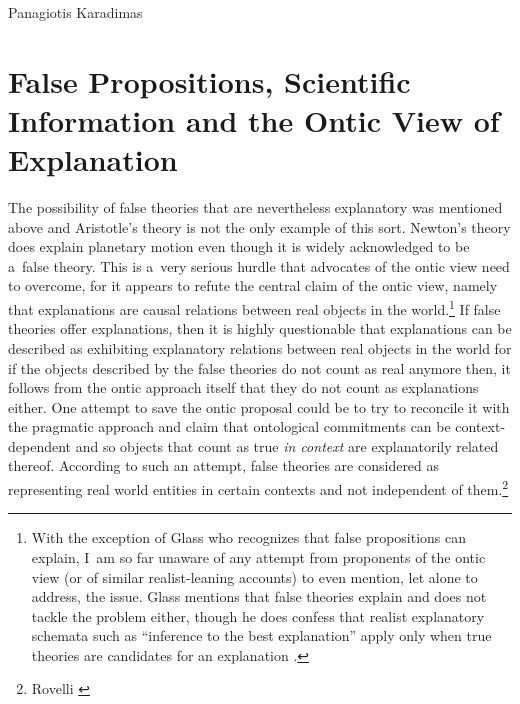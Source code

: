 \begin{artengenv}{Panagiotis Karadimas}
\section{False Propositions, Scientific Information and the Ontic View of Explanation}
The possibility of false theories that are nevertheless explanatory was mentioned above and Aristotle's theory is not the only example of this sort. Newton's theory does explain planetary motion even though it is widely acknowledged to be a~false theory. This is a~very serious hurdle that advocates of the ontic view need to overcome, for it appears to refute the central claim of the ontic view, namely that explanations are causal relations between real objects in the world.\footnote{With the exception of Glass who recognizes that false propositions can explain, I~am so far unaware of any attempt from proponents of the ontic view (or of similar realist-leaning accounts) to even mention, let alone to address, the issue. Glass mentions that false theories explain and does not tackle the problem either, though he does confess that realist explanatory schemata such as ``inference to the best explanation'' apply only when true theories are candidates for an explanation
\parencite[][]{glass_coherence_2021}.%
} If false theories offer explanations, then it is highly questionable that explanations can be described as exhibiting explanatory relations between real objects in the world for if the objects described by the false theories do not count as real anymore then, it follows from the ontic approach itself that they do not count as explanations either. One attempt to save the ontic proposal could be to try to reconcile it with the pragmatic approach and claim that ontological commitments can be context-dependent and so objects that count as true \textit{in context} are explanatorily related thereof. According to such an attempt, false theories are considered as representing real world entities in certain contexts and not independent of them.\footnote{Rovelli 
\parencite*[][]{rovelli_aristotles_2015} %
}
\end{artengenv}
